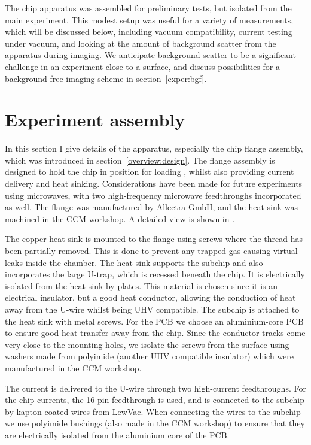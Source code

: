 The chip apparatus was assembled for preliminary tests, but isolated from the 
main \CaF{} experiment. This modest setup was useful for a variety of
measurements, which will be discussed below, including vacuum compatibility,
current testing under vacuum, and looking at the amount of background scatter
from the apparatus during imaging. We anticipate background scatter to be a
significant challenge in an experiment close to a surface, and discuss
possibilities for a background-free imaging scheme in
section~\ref{exper:bgf}.

\section{Experiment assembly}

In this section I give details of the apparatus, especially the chip flange
assembly, which was introduced in section~\ref{overview:design}. The flange
assembly is designed to hold the chip in position for loading \CaF{}, whilst
also providing current delivery and heat sinking. Considerations have been made
for future experiments using microwaves, with two high-frequency microwave
feedthroughs incorporated as well. The flange was manufactured by Allectra
GmbH, and the heat sink was machined in the CCM workshop.  A detailed view is
shown in .

The copper heat sink is mounted to the flange using screws where the thread has
been partially removed. This is done to prevent any trapped gas causing virtual
leaks inside the chamber. The heat sink supports the subchip and also
incorporates the large U-trap, which is recessed beneath the chip. It is
electrically isolated from the heat sink by \AlN{} plates. This material is
chosen since it is an electrical insulator, but a good heat conductor, allowing
the conduction of heat away from the U-wire whilst being UHV compatible. The
subchip is attached to the heat sink with metal screws. For the PCB we choose
an aluminium-core PCB to ensure good heat transfer away from the chip. Since the
conductor tracks come very close to the mounting holes, we isolate the screws
from the surface using washers made from polyimide (another UHV compatible
insulator) which were manufactured in the CCM workshop.

The current is delivered to the U-wire through two high-current feedthroughs.
For the chip currents, the 16-pin feedthrough is used, and is connected to the
subchip by kapton-coated wires from LewVac. When connecting the wires to the
subchip we use polyimide bushings (also made in the CCM workshop) to ensure
that they are electrically isolated from the aluminium core of the PCB.

